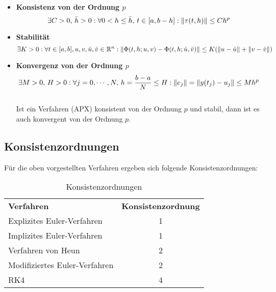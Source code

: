         \begin{itemize}
        	\item \textbf{Konsistenz von der Ordnung \(p\)}
	        	\begin{equation*}
		        	\exists C > 0,\, \bar{h} > 0 : \forall 0 < h \leq \bar{h},\, t \in [a, b - h] : \norm{\tau(t, h)} \leq C h^p
	        	\end{equation*}
        	\item \textbf{Stabilität}
	        	\begin{equation*}
		        	\exists K > 0 : \forall t \in [a, b], u, v, \tilde{u}, \tilde{v} \in \mathbb{R}^n : \norm{\Phi(t, h; u, v) - \Phi(t, h; \tilde{u}, \tilde{v})} \leq K (\norm{u - \tilde{u}} + \norm{v - \tilde{v}})
	        	\end{equation*}
        	\item \textbf{Konvergenz von der Ordnung \(p\)}
	        	\begin{equation*}
		        	\exists M > 0,\, H > 0 : \forall j = 0, \cdots, N,\, h = \frac{b-a}{N} \leq H : \norm{e_j} = \norm{y(t_j) - u_j} \leq M h^p
	        	\end{equation*} \\ Ist ein Verfahren (APX) konsistent von der Ordnung \(p\) und stabil, dann ist es auch konvergent von der Ordnung \(p\).
        \end{itemize}

        \subsection{Konsistenzordnungen}
	        Für die oben vorgestellten Verfahren ergeben sich folgende Konsistenzordnungen:
	        \begin{table}[H]
	        	\centering
	        	\begin{tabular}{l c}
	        		\textbf{Verfahren}            & \textbf{Konsistenzordnung} \\
	        		Explizites Euler-Verfahren    & 1                          \\
	        		Implizites Euler-Verfahren    & 1                          \\
	        		Verfahren von Heun            & 2                          \\
	        		Modifiziertes Euler-Verfahren & 2                          \\
	        		RK4                           & 4
	        	\end{tabular}
	        	\caption{Konsistenzordnungen}
	        	\label{tab:consistency}
	        \end{table}

